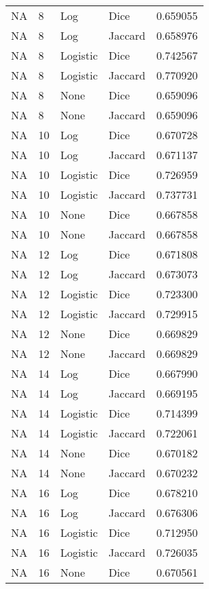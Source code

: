 \documentclass{article}
\begin{document}
\begin{center}
\begin{supertabular}{| l | l | l | l | l |}
            NA & 8 & Log & Dice & 0.659055 \\
            NA & 8 & Log & Jaccard & 0.658976 \\
            NA & 8 & Logistic & Dice & 0.742567 \\
            NA & 8 & Logistic & Jaccard & 0.770920 \\
            NA & 8 & None & Dice & 0.659096 \\
            NA & 8 & None & Jaccard & 0.659096 \\
            NA & 10 & Log & Dice & 0.670728 \\
            NA & 10 & Log & Jaccard & 0.671137 \\
            NA & 10 & Logistic & Dice & 0.726959 \\
            NA & 10 & Logistic & Jaccard & 0.737731 \\
            NA & 10 & None & Dice & 0.667858 \\
            NA & 10 & None & Jaccard & 0.667858 \\
            NA & 12 & Log & Dice & 0.671808 \\
            NA & 12 & Log & Jaccard & 0.673073 \\
            NA & 12 & Logistic & Dice & 0.723300 \\
            NA & 12 & Logistic & Jaccard & 0.729915 \\
            NA & 12 & None & Dice & 0.669829 \\
            NA & 12 & None & Jaccard & 0.669829 \\
            NA & 14 & Log & Dice & 0.667990 \\
            NA & 14 & Log & Jaccard & 0.669195 \\
            NA & 14 & Logistic & Dice & 0.714399 \\
            NA & 14 & Logistic & Jaccard & 0.722061 \\
            NA & 14 & None & Dice & 0.670182 \\
            NA & 14 & None & Jaccard & 0.670232 \\
            NA & 16 & Log & Dice & 0.678210 \\
            NA & 16 & Log & Jaccard & 0.676306 \\
            NA & 16 & Logistic & Dice & 0.712950 \\
            NA & 16 & Logistic & Jaccard & 0.726035 \\
            NA & 16 & None & Dice & 0.670561 \\

\end{supertabular}
\end{center}
\end{document}
